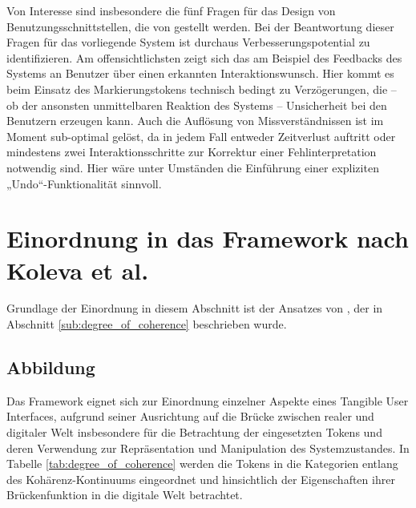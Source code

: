Von Interesse sind insbesondere die fünf Fragen für das Design von Benutzungsschnittstellen, die von  \citep{Bellotti02} gestellt werden. Bei der Beantwortung dieser Fragen für das vorliegende System ist durchaus Verbesserungspotential zu identifizieren. Am offensichtlichsten zeigt sich das am Beispiel des Feedbacks des Systems an Benutzer über einen erkannten Interaktionswunsch. Hier kommt es beim Einsatz des Markierungstokens technisch bedingt zu Verzögerungen, die -- ob der ansonsten unmittelbaren Reaktion des Systems -- Unsicherheit bei den Benutzern erzeugen kann. Auch die Auflösung von Missverständnissen ist im Moment sub-optimal gelöst, da in jedem Fall entweder Zeitverlust auftritt oder mindestens zwei Interaktionsschritte zur Korrektur einer Fehlinterpretation notwendig sind. Hier wäre unter Umständen die Einführung einer expliziten „Undo“-Funktionalität sinnvoll.


\section{Einordnung in das Framework nach Koleva et al.} %
\label{sec:einordnung_in_das_framework_nach_koleva_et_al_}

Grundlage der Einordnung in diesem Abschnitt ist der Ansatzes von \citep{Koleva03}, der in Abschnitt \ref{sub:degree_of_coherence} beschrieben wurde.

\subsection{Abbildung} %
\label{sub:abbildung}

Das Framework eignet sich zur Einordnung einzelner Aspekte eines Tangible User Interfaces, aufgrund seiner Ausrichtung auf die Brücke zwischen realer und digitaler Welt insbesondere für die Betrachtung der eingesetzten Tokens und deren Verwendung zur Repräsentation und Manipulation des Systemzustandes. In Tabelle \ref{tab:degree_of_coherence} werden die Tokens in die Kategorien entlang des Kohärenz-Kontinuums eingeordnet und hinsichtlich der Eigenschaften ihrer Brückenfunktion in die digitale Welt betrachtet. 

